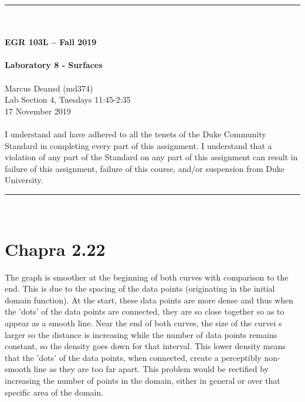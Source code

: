 \documentclass{article}
\begin{document}
\begin{center}
\rule{6.5in}{0.5mm}\\~\\
\textbf{\large EGR 103L -- Fall 2019}\\~\\
\textbf{\huge Laboratory 8 - Surfaces}\\~\\
Marcus Deansd (md374)\\
Lab Section 4, Tuesdays 11:45-2:35\\
17 November 2019\\~\\
{\small I understand and have adhered to all the tenets of the Duke
  Community Standard in completing every part of this assignment.  I
  understand that a violation of any part of the Standard on any part
  of this assignment can result in failure of this assignment, failure
  of this course, and/or suspension from Duke University.} 
\rule{6.5in}{0.5mm}\\
\end{center}
\tableofcontents
\listoffigures
\renewcommand{\arraystretch}{1.5}
\clearpage

\section{Chapra 2.22}
The graph is smoother at the beginning of both curves with comparison to the end. This is due to the spacing of the data points (originating in the initial domain function). At the start, these data points are more dense and thus when the 'dots' of the data points are connected, they are so close together so as to appear as a smooth line. Near the end of both curves, the size of the  curvei s larger so the distance is increasing while the number of data points remains constant, so the density goes down for that interval. This lower density means that the 'dots' of the data points, when connected, create a perceptibly non-smooth line as they are too far apart. This problem would be rectified by increasing the number of points in the domain, either in general or over that specific area of the domain. 
\end{document}
